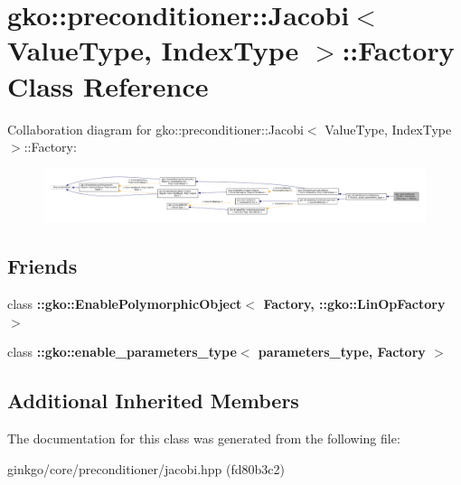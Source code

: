 \hypertarget{classgko_1_1preconditioner_1_1Jacobi_1_1Factory}{}\section{gko\+:\+:preconditioner\+:\+:Jacobi$<$ Value\+Type, Index\+Type $>$\+:\+:Factory Class Reference}
\label{classgko_1_1preconditioner_1_1Jacobi_1_1Factory}


Collaboration diagram for gko\+:\+:preconditioner\+:\+:Jacobi$<$ Value\+Type, Index\+Type $>$\+:\+:Factory\+:
\nopagebreak
\begin{figure}[H]
\begin{center}
\leavevmode
\includegraphics[width=350pt]{classgko_1_1preconditioner_1_1Jacobi_1_1Factory__coll__graph}
\end{center}
\end{figure}
\subsection*{Friends}
\begin{DoxyCompactItemize}
\item 
\mbox{\label{classgko_1_1preconditioner_1_1Jacobi_1_1Factory_a27e9bbc94a1c1c59f40833153eda8f78}} 
class {\bfseries \+::gko\+::\+Enable\+Polymorphic\+Object$<$ Factory, \+::gko\+::\+Lin\+Op\+Factory $>$}
\item 
\mbox{\label{classgko_1_1preconditioner_1_1Jacobi_1_1Factory_a0d176cbd42d6214e11aee8c30ca256fc}} 
class {\bfseries \+::gko\+::enable\+\_\+parameters\+\_\+type$<$ parameters\+\_\+type, Factory $>$}
\end{DoxyCompactItemize}
\subsection*{Additional Inherited Members}


The documentation for this class was generated from the following file\+:\begin{DoxyCompactItemize}
\item 
ginkgo/core/preconditioner/jacobi.\+hpp (fd80b3c2)\end{DoxyCompactItemize}
